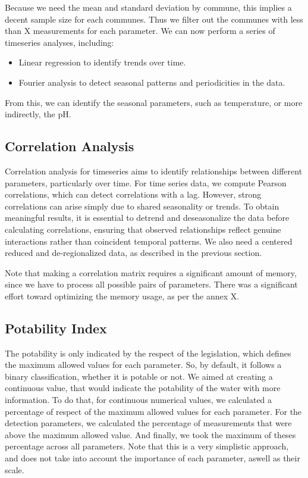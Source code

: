\documentclass{article}
\begin{document}
Because we need the mean and standard deviation by commune, this implies a decent sample size for each communes.
Thus we filter out the communes with less than X measurements for each parameter.
We can now perform a series of timeseries analyses, including:
\begin{itemize}
    \item Linear regression to identify trends over time.
    \item Fourier analysis to detect seasonal patterns and periodicities in the data.
\end{itemize}

From this, we can identify the seasonal parameters, such as temperature, or more indirectly, the pH.

\subsection{Correlation Analysis}
Correlation analysis for timeseries aims to identify relationships between different parameters, 
particularly over time. For time series data, we compute Pearson correlations, which can detect correlations with a lag.
However, strong correlations can arise simply due to shared seasonality or trends. 
To obtain meaningful results, it is essential to detrend and deseasonalize 
the data before calculating correlations, ensuring that observed relationships 
reflect genuine interactions rather than coincident temporal patterns.
We also need a centered reduced and de-regionalized data, as described in the previous section.

Note that making a correlation matrix requires a significant amount of memory,
since we have to process all possible pairs of parameters.
There was a significant effort toward optimizing the memory usage, as per the annex X.

\subsection{Potability Index}
The potability is only indicated by the respect of the legislation, which defines the maximum allowed values for each parameter.
So, by default, it follows a binary classification, whether it is potable or not.
We aimed at creating a continuous value, that would indicate the potability of the water with more information.
To do that, for continuous numerical values, we calculated a percentage of respect of the maximum allowed values for each parameter.
For the detection parameters, we calculated the percentage of measurements that were above the maximum allowed value.
And finally, we took the maximum of theses percentage across all parameters.
Note that this is a very simplistic approach, and does not take into account the importance of each parameter, aswell as their scale.
\end{document}
